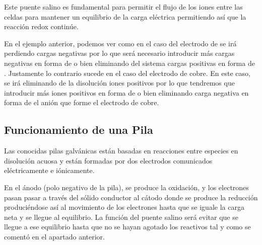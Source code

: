     Este puente salino es fundamental para permitir el flujo de los iones entre las celdas para mantener un equilibrio de la carga eléctrica permitiendo así que la reacción redox continúe.

    En el ejemplo anterior, podemos ver como en el caso del electrodo de  se irá perdiendo cargas negativas por lo que será necesario introducir más cargas negativas en forma de  o bien eliminando del sistema cargas positivas en forma de .
    Justamente lo contrario sucede en el caso del electrodo de cobre.
    En este caso, se irá eliminando de la disolución iones positivos por lo que tendremos que introducir más iones positivos en forma de  o bien eliminando carga negativa en forma de el anión que forme el electrodo de cobre.

    \subsection{Funcionamiento de una Pila}\label{subsec:funcionamiento-de-una-pila}


    Las conocidas pilas galvánicas están basadas en reacciones entre especies en disolución acuosa y están formadas por dos electrodos comunicados eléctricamente e iónicamente.


    En el ánodo (polo negativo de la pila), se produce la oxidación, y los electrones pasan pasar a través del sólido conductor al cátodo donde se produce la reducción produciéndose así al movimiento de los electrones hasta que se iguale la carga neta y se llegue al equilibrio.
    La función del puente salino será evitar que se llegue a ese equilibrio hasta que no se hayan agotado los reactivos tal y como se comentó en el apartado anterior.

